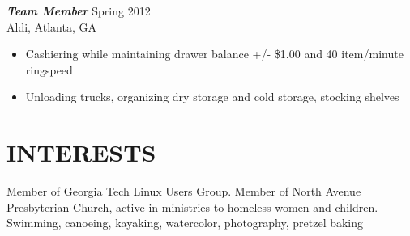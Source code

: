 \documentclass[margin]{res}
\begin{document}
\begin{resume}

                {\sl \textbf{Team Member}} \hfill       Spring 2012 \\
                Aldi, Atlanta, GA
                  \begin{itemize}  \itemsep -2pt
                   \item Cashiering while maintaining drawer balance +/- \$1.00 and 40 item/minute ringspeed
                   \item Unloading trucks, organizing dry storage and cold storage, stocking shelves
                   \end{itemize} 
 
\section{INTERESTS}  Member of Georgia Tech Linux Users Group. Member of North Avenue Presbyterian Church, 
                    active in ministries to homeless women and children. \\Swimming, canoeing, kayaking, watercolor, photography, pretzel baking\\
   

\end{resume}
\end{document}

